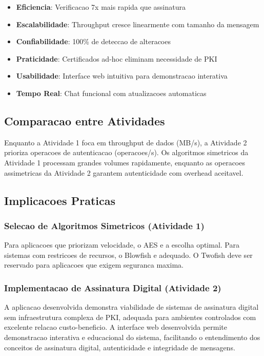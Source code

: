 \documentclass[12pt,a4paper,oneside]{article}
\begin{document}
\begin{itemize}
    \item \textbf{Eficiencia}: Verificacao 7x mais rapida que assinatura
    \item \textbf{Escalabilidade}: Throughput cresce linearmente com tamanho da mensagem
    \item \textbf{Confiabilidade}: 100\% de deteccao de alteracoes
    \item \textbf{Praticidade}: Certificados ad-hoc eliminam necessidade de PKI
    \item \textbf{Usabilidade}: Interface web intuitiva para demonstracao interativa
    \item \textbf{Tempo Real}: Chat funcional com atualizacoes automaticas
\end{itemize}

\subsection{Comparacao entre Atividades}

Enquanto a Atividade 1 foca em throughput de dados (MB/s), a Atividade 2 prioriza operacoes de autenticacao (operacoes/s). Os algoritmos simetricos da Atividade 1 processam grandes volumes rapidamente, enquanto as operacoes assimetricas da Atividade 2 garantem autenticidade com overhead aceitavel.

\subsection{Implicacoes Praticas}

\subsubsection{Selecao de Algoritmos Simetricos (Atividade 1)}

Para aplicacoes que priorizam velocidade, o AES e a escolha optimal. Para sistemas com restricoes de recursos, o Blowfish e adequado. O Twofish deve ser reservado para aplicacoes que exigem seguranca maxima.

\subsubsection{Implementacao de Assinatura Digital (Atividade 2)}

A aplicacao desenvolvida demonstra viabilidade de sistemas de assinatura digital sem infraestrutura complexa de PKI, adequada para ambientes controlados com excelente relacao custo-beneficio. A interface web desenvolvida permite demonstracao interativa e educacional do sistema, facilitando o entendimento dos conceitos de assinatura digital, autenticidade e integridade de mensagens.
\end{document}
